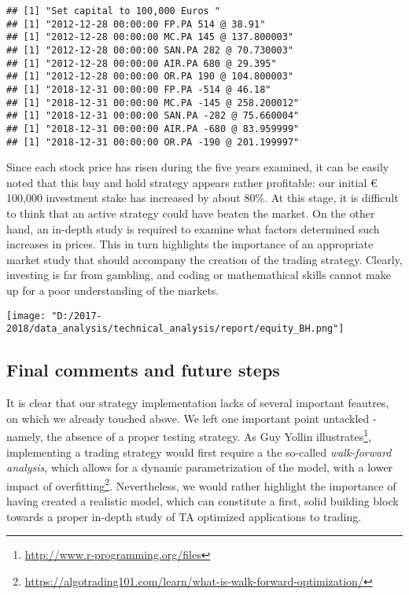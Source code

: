 \documentclass[
  11pt,
]{article}
\let\origfigure\figure
\let\endorigfigure\endfigure
\renewenvironment{figure}[1][2] {
    \expandafter\origfigure\expandafter[H]
} {
    \endorigfigure
}
\begin{document}
\begin{verbatim}
## [1] "Set capital to 100,000 Euros "
## [1] "2012-12-28 00:00:00 FP.PA 514 @ 38.91"
## [1] "2012-12-28 00:00:00 MC.PA 145 @ 137.800003"
## [1] "2012-12-28 00:00:00 SAN.PA 282 @ 70.730003"
## [1] "2012-12-28 00:00:00 AIR.PA 680 @ 29.395"
## [1] "2012-12-28 00:00:00 OR.PA 190 @ 104.800003"
## [1] "2018-12-31 00:00:00 FP.PA -514 @ 46.18"
## [1] "2018-12-31 00:00:00 MC.PA -145 @ 258.200012"
## [1] "2018-12-31 00:00:00 SAN.PA -282 @ 75.660004"
## [1] "2018-12-31 00:00:00 AIR.PA -680 @ 83.959999"
## [1] "2018-12-31 00:00:00 OR.PA -190 @ 201.199997"
\end{verbatim}

Since each stock price has risen during the five years examined, it can
be easily noted that this buy and hold strategy appears rather
profitable: our initial € 100,000 investment stake has increased by
about 80\%. At this stage, it is difficult to think that an active
strategy could have beaten the market. On the other hand, an in-depth
study is required to examine what factors determined such increases in
prices. This in turn highlights the importance of an appropriate market
study that should accompany the creation of the trading strategy.
Clearly, investing is far from gambling, and coding or mathemathical
skills cannot make up for a poor understanding of the markets.

\begin{figure}
\centering
\texttt{[image: "D:/2017-2018/data\_analysis/technical\_analysis/report/equity\_BH.png"]}
\caption{Account Capital level at closing of long positions in B\&H
strategy}
\end{figure}

\hypertarget{final-comments-and-future-steps}{%
\subsection{Final comments and future
steps}\label{final-comments-and-future-steps}}

It is clear that our strategy implementation lacks of several important
feautres, on which we already touched above. We left one important point
untackled - namely, the absence of a proper testing strategy. As Guy
Yollin illustrates\footnote{\url{http://www.r-programming.org/files}},
implementing a trading strategy would first require a the so-called
\emph{walk-forward analysis}, which allows for a dynamic parametrization
of the model, with a lower impact of overfitting\footnote{\url{https://algotrading101.com/learn/what-is-walk-forward-optimization/}}.
Nevertheless, we would rather highlight the importance of having created
a realistic model, which can constitute a first, solid building block
towards a proper in-depth study of TA optimized applications to trading.
\end{document}
